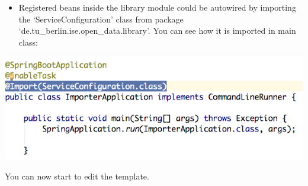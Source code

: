 \documentclass{llncs}
\providecommand{\tightlist}{%
  \setlength{\itemsep}{0pt}\setlength{\parskip}{0pt}}
\begin{document}
\begin{thebibliography}{}
\begin{itemize}
\tightlist
\item
  Registered beans inside the library module could be autowired by
  importing the `ServiceConfiguration' class from package
  `de.tu\_berlin.ise.open\_data.library'. You can see how it is imported
  in main class:
\end{itemize}

\includegraphics{images/template.png}

You can now start to edit the template.


\end{thebibliography}
\end{document}

